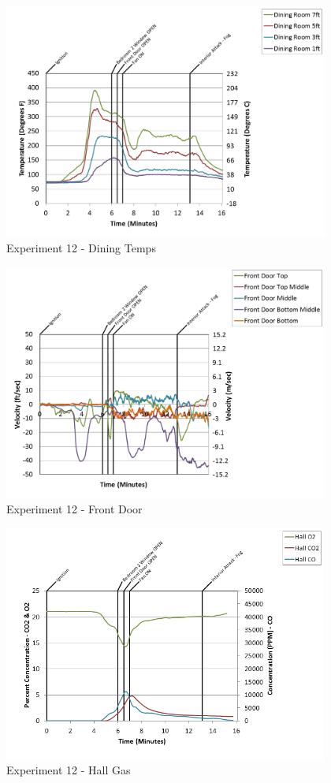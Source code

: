 \documentclass{article}
\begin{document}
\begin{appendices}
\begin{figure}[h!]
	\centering
	\includegraphics[height=3.05in]{0_Images/Results_Charts/Exp_12_Charts/DiningTemps.png}
	\caption{Experiment 12 - Dining Temps}
\end{figure}

\clearpage

\begin{figure}[h!]
	\centering
	\includegraphics[height=3.05in]{0_Images/Results_Charts/Exp_12_Charts/FrontDoor.png}
	\caption{Experiment 12 - Front Door}
\end{figure}


\begin{figure}[h!]
	\centering
	\includegraphics[height=3.05in]{0_Images/Results_Charts/Exp_12_Charts/HallGas.png}
	\caption{Experiment 12 - Hall Gas}
\end{figure}


\end{appendices}
\end{document}

